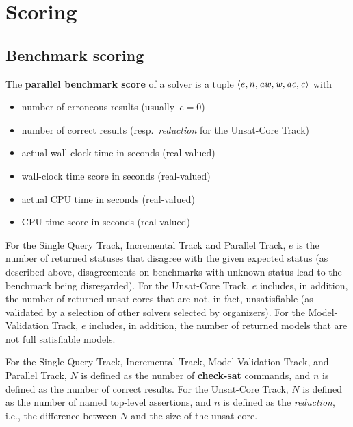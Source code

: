 \documentclass[12pt]{article}
\newcommand{\akey}[1]{\textbf{#1}\xspace}
\newcommand{\maintrack}{Single Query Track\xspace}
\newcommand{\inctrack}{Incremental Track\xspace}
\newcommand{\ucoretrack}{Unsat-Core Track\xspace}
\newcommand{\mvaltrack}{Model-Validation Track\xspace}
\newcommand{\paralleltrack}{Parallel Track\xspace}
\begin{document}
\section{Scoring}
\label{sec:scoring}

\subsection{Benchmark scoring}
\label{sec:benchmark-scoring}

The \textbf{parallel benchmark score} of a solver is a tuple $\langle
e, n, \it{aw}, w, \it{ac},c\rangle$ with
\begin{itemize}[noitemsep]
  \vspace{-1ex}
  \item {}
    number of erroneous results (usually~$e = 0$)
  \item {}
    number of correct results (resp.~\emph{reduction} for the \ucoretrack)
  \item {}
    actual wall-clock time in seconds (real-valued)
  \item {}
    wall-clock time score in seconds (real-valued)
  \item {}
    actual CPU time in seconds (real-valued)
  \item {}
    CPU time score in seconds (real-valued)
\end{itemize}

For the \maintrack, \inctrack and \paralleltrack,
$e$ is the number of returned
statuses that disagree with the given expected status (as described above,
disagreements on benchmarks with unknown status lead to the benchmark being
disregarded). For the \ucoretrack, $e$ includes, in addition, the number of
returned unsat cores that are not, in fact, unsatisfiable (as
validated by a selection of other solvers selected by organizers).  For the
\mvaltrack, $e$ includes, in addition, the number of returned models that are
not full satisfiable models.

For the \maintrack, \inctrack, \mvaltrack, and \paralleltrack,
$N$ is defined as the number of \akey{check-sat} commands, and
$n$ is defined as the number of correct results.
For the \ucoretrack, $N$ is defined as the number of named top-level assertions,
and $n$ is defined as the \emph{reduction}, i.e., the difference between $N$
and the size of the unsat core.
\end{document}

